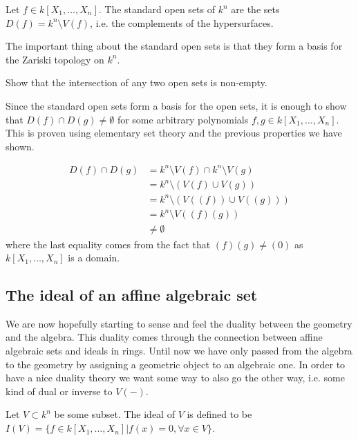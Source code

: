 \begin{definition}
Let $f\in k[X_1, \ldots, X_n]$. The standard open sets of $k^n$ are the sets $D(f)=k^n \setminus V(f)$, i.e. the complements of the hypersurfaces. 
\end{definition}

The important thing about the standard open sets is that they form a basis for the Zariski topology on $k^n$. 

\begin{problem}
Show that the intersection of any two open sets is non-empty. 
\end{problem}
\begin{solution}
Since the standard open sets form a basis for the open sets, it is enough to show that $D(f)\cap D(g) \neq \emptyset$ for some arbitrary polynomials $f, g\in k[X_1, \ldots, X_n]$. This is proven using elementary set theory and the previous properties we have shown. 

\begin{align*}
    D(f)\cap D(g) 
    &= k^n\setminus V(f) \cap k^n\setminus V(g) \\
    &= k^n\setminus (V(f)\cup V(g)) \\
    &= k^n\setminus (V((f))\cup V((g))) \\
    &= k^n\setminus V((f)(g)) \\
    &\neq \emptyset
\end{align*}
where the last equality comes from the fact that $(f)(g)\neq (0)$ as $k[X_1, \ldots, X_n]$ is a domain.  
\end{solution}

\subsection{The ideal of an affine algebraic set}

We are now hopefully starting to sense and feel the duality between the geometry and the algebra. This duality comes through the connection between affine algebraic sets and ideals in rings. Until now we have only passed from the algebra to the geometry by assigning a geometric object to an algebraic one. In order to have a nice duality theory we want some way to also go the other way, i.e. some kind of dual or inverse to $V(-)$. 

\begin{definition}
Let $V\subset k^n$ be some subset. The ideal of $V$ is defined to be $I(V)=\{ f\in k[X_1, \ldots, X_n] \vert f(x)=0, \forall x\in V \}$. 
\end{definition}

